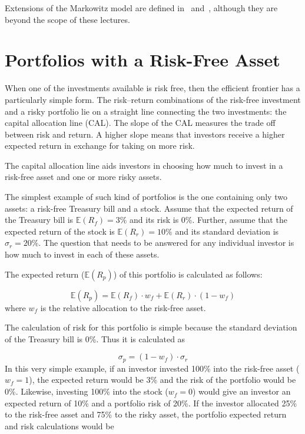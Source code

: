 Extensions of the Markowitz model are defined in~\cite{bib:post_modern_theory} and~\cite{bib:black_litterman}, 
although they are beyond the scope of these lectures. 
    
\section{Portfolios with a Risk-Free Asset}
\label{portfolios-with-a-risk-free-asset}

When one of the investments available is risk free, then the efficient
frontier has a particularly simple form. The risk–return combinations of the risk-free investment and a risky portfolio lie on a straight line connecting the two investments: the capital allocation line (CAL). The slope of the CAL measures the trade off
between risk and return. A higher slope means that investors receive a
higher expected return in exchange for taking on more risk.

The capital allocation line aids investors in choosing how much to
invest in a risk-free asset and one or more risky assets.

The simplest example of such kind of portfolios is the one containing only two assets: a risk-free Treasury bill and a stock. Assume that the expected return of the Treasury bill is \(\mathbb{E}(R_f)=3\%\) and its risk is 0\%. Further, assume that the expected return of the stock is \(\mathbb{E}(R_r)=10\%\) and its standard deviation is \(\sigma_r=20\%\). The question that needs to be answered
for any individual investor is how much to invest in each of these
assets.

The expected return (\(\mathbb{E}(R_p)\)) of this portfolio is calculated as follows:

\begin{equation*} 
	\mathbb{E}(R_p) = \mathbb{E}(R_f)\cdot w_f + \mathbb{E}(R_r)\cdot (1- w_f) 
\end{equation*}
where \(w_f\) is the relative allocation to the risk-free asset.

The calculation of risk for this portfolio is simple because the
standard deviation of the Treasury bill is 0\%. Thus it is calculated
as

\begin{equation*} 
	\sigma_p = (1-w_f)\cdot \sigma_r 
\end{equation*}
In this very simple example, if an investor invested 100\% into
the risk-free asset (\(w_f=1\)), the expected return would be 3\% and
the risk of the portfolio would be 0\%. Likewise, investing 100\% into
the stock (\(w_f=0\)) would give an investor an expected return of 10\%
and a portfolio risk of 20\%. If the investor allocated 25\% to the
risk-free asset and 75\% to the risky asset, the portfolio expected
return and risk calculations would be


